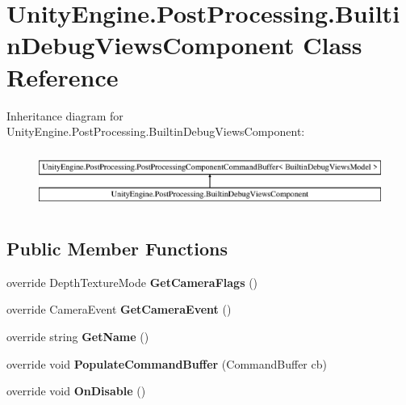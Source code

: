 \hypertarget{class_unity_engine_1_1_post_processing_1_1_builtin_debug_views_component}{}\section{Unity\+Engine.\+Post\+Processing.\+Builtin\+Debug\+Views\+Component Class Reference}
\label{class_unity_engine_1_1_post_processing_1_1_builtin_debug_views_component}
Inheritance diagram for Unity\+Engine.\+Post\+Processing.\+Builtin\+Debug\+Views\+Component\+:\begin{figure}[H]
\begin{center}
\leavevmode
\includegraphics[height=1.911263cm]{class_unity_engine_1_1_post_processing_1_1_builtin_debug_views_component}
\end{center}
\end{figure}
\subsection*{Public Member Functions}
\begin{DoxyCompactItemize}
\item 
\mbox{\label{class_unity_engine_1_1_post_processing_1_1_builtin_debug_views_component_ab4292e4509256eb32cb378060fa3250f}} 
override Depth\+Texture\+Mode {\bfseries Get\+Camera\+Flags} ()
\item 
\mbox{\label{class_unity_engine_1_1_post_processing_1_1_builtin_debug_views_component_a6f11761eaeb91f54400f5b9a3f5864b2}} 
override Camera\+Event {\bfseries Get\+Camera\+Event} ()
\item 
\mbox{\label{class_unity_engine_1_1_post_processing_1_1_builtin_debug_views_component_a18f07a927f8d2aee8f5e7bf045b87714}} 
override string {\bfseries Get\+Name} ()
\item 
\mbox{\label{class_unity_engine_1_1_post_processing_1_1_builtin_debug_views_component_a5eb24d5ee1ad5360967bfd5bc2c8485b}} 
override void {\bfseries Populate\+Command\+Buffer} (Command\+Buffer cb)
\item 
\mbox{\label{class_unity_engine_1_1_post_processing_1_1_builtin_debug_views_component_a67be7492ee423602f45ad4ce2896fae1}} 
override void {\bfseries On\+Disable} ()
\end{DoxyCompactItemize}
